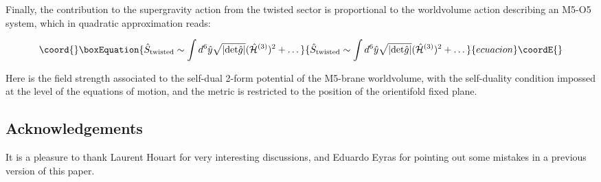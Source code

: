\documentclass[12pt,a4paper]{article}
\begin{document}
Finally, the contribution to the supergravity action from the twisted sector
is proportional to the worldvolume action describing an M5-O5 system, 
which in quadratic approximation reads:

\begin{equation}\coord{}\boxEquation{
{\hat S}_{{\rm twisted}}\sim\int d^6 {\hat y} \sqrt{|{\rm det}
{\hat g}|} ({\hat {\cal H}}^{(3)})^2+\dots
}{
{\hat S}_{{\rm twisted}}\sim\int d^6 {\hat y} \sqrt{|{\rm det}
{\hat g}|} ({\hat {\cal H}}^{(3)})^2+\dots
}{ecuacion}\coordE{}\end{equation}

\noindent Here \coordHE{} is the field strength associated
to the self-dual 2-form potential of the M5-brane worldvolume, with
the self-duality condition impossed at the level
of the equations of motion, and the metric is restricted to the position
of the orientifold fixed plane.

 
\subsection*{Acknowledgements}

It is a pleasure to thank Laurent Houart for very interesting discussions,
and Eduardo Eyras for pointing out some mistakes in a previous version
of this paper.
\end{document}

